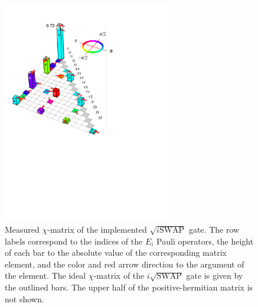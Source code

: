 \begin{figure} \includegraphics[width=0.65\textwidth]{./material/papers/iswap/figures/chi_matrix}
\caption[Measured $\chi$-matrix of the $\sqrt{i\textrm{SWAP}}$ gate]{Measured $\chi$-matrix of the implemented $\sqrt{i\mathrm{SWAP}}$ gate. The row labels correspond to the indices of the $E_{i}$ Pauli operators, the height of each bar to the absolute value of the corresponding matrix element, and the color and red arrow direction to the argument of the element. The ideal $\chi$-matrix of the $i\sqrt{\mathrm{SWAP}}$ gate is given by the outlined bars. The upper half of the positive-hermitian matrix is not shown.}


\label{fig:gate_chi_matrix_and_errors} \end{figure}

